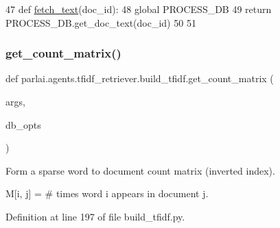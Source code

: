 \begin{DoxyCode}
47 \textcolor{keyword}{def }\hyperlink{namespaceparlai_1_1agents_1_1tfidf__retriever_1_1build__tfidf_a8f16fdf4641c497d12c19f128ed4647a}{fetch\_text}(doc\_id):
48     \textcolor{keyword}{global} PROCESS\_DB
49     \textcolor{keywordflow}{return} PROCESS\_DB.get\_doc\_text(doc\_id)
50 
51 
\end{DoxyCode}
\mbox{\label{namespaceparlai_1_1agents_1_1tfidf__retriever_1_1build__tfidf_a0d95180be94e232e3ebc748c8aa7b9a0}} 
\subsubsection{\texorpdfstring{get\+\_\+count\+\_\+matrix()}{get\_count\_matrix()}}
{\footnotesize\ttfamily def parlai.\+agents.\+tfidf\+\_\+retriever.\+build\+\_\+tfidf.\+get\+\_\+count\+\_\+matrix (\begin{DoxyParamCaption}\item[{}]{args,  }\item[{}]{db\+\_\+opts }\end{DoxyParamCaption})}

\begin{DoxyVerb}Form a sparse word to document count matrix (inverted index).

M[i, j] = # times word i appears in document j.
\end{DoxyVerb}
 

Definition at line 197 of file build\+\_\+tfidf.\+py.


